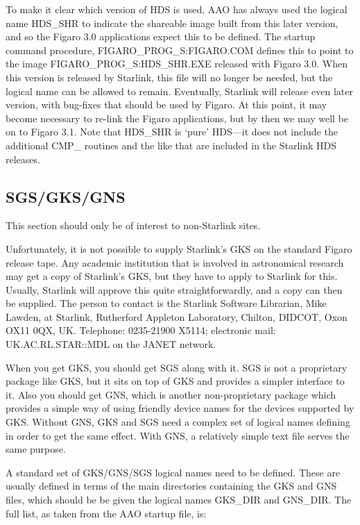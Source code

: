 To make it clear which version of HDS is used, AAO has always used the logical 
name HDS\_SHR to indicate the shareable image built from this later version,
and so the Figaro 3.0 applications expect this to be defined. The startup 
command procedure, FIGARO\_PROG\_S:FIGARO.COM defines this to point to the
image FIGARO\_PROG\_S:HDS\_SHR.EXE released with Figaro 3.0. When this version
is released by Starlink, this file will no longer be needed, but the  logical
name can be allowed to remain. Eventually, Starlink will release even later
version, with bug-fixes that should be used by Figaro. At this point, it may
become necessary to re-link the Figaro applications, but by then we may well be
on to Figaro 3.1. Note that HDS\_SHR is `pure' HDS---it  does not include the
additional CMP\_ routines and the like that are included in the Starlink HDS
releases.

\subsection{SGS/GKS/GNS}

This section should only be of interest to non-Starlink sites.

Unfortunately, it is not possible to supply Starlink's GKS on the standard 
Figaro  release  tape. Any  academic  institution  that is involved in
astronomical research may get a copy  of  Starlink's  GKS, but they have to
apply to Starlink for this. Usually, Starlink will approve this quite
straightforwardly, and a copy can then be supplied. The person to contact is
the Starlink Software Librarian, Mike Lawden, at Starlink, Rutherford Appleton 
Laboratory,  Chilton,  DIDCOT,  Oxon OX11 0QX, UK. Telephone:   0235-21900 
X5114;  electronic  mail: UK.AC.RL.STAR::MDL on the JANET network.

When you get GKS, you should get SGS along with it.  SGS is not a proprietary
package like GKS, but it sits on top of GKS and provides a simpler interface to
it.  Also you should get GNS,  which  is  another non-proprietary  package
which provides a simple way of using friendly device names for the devices
supported by GKS.  Without GNS,  GKS  and SGS  need  a complex set of logical
names defining in order to get the same effect.  With GNS, a relatively simple
text file serves the  same purpose.

A standard set of GKS/GNS/SGS logical names need to be defined. These are
usually defined in terms of the main directories containing the GKS and GNS
files, which should be be given the logical names GKS\_DIR and GNS\_DIR. The
full list, as taken from the AAO startup file, is:

